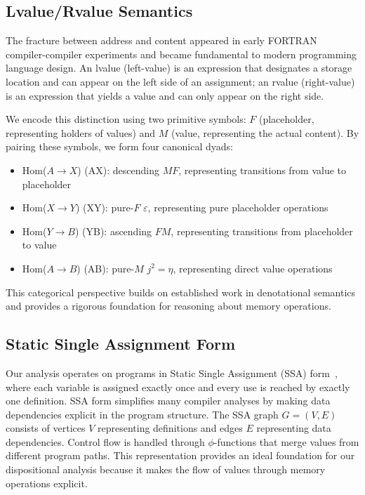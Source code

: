 \documentclass[acmsmall,anonymous,review,screen]{acmart}
\begin{document}
	\subsection{Lvalue/Rvalue Semantics}
	
	The fracture between address and content appeared in early FORTRAN compiler-compiler experiments and became fundamental to modern programming language design. An lvalue (left-value) is an expression that designates a storage location and can appear on the left side of an assignment; an rvalue (right-value) is an expression that yields a value and can only appear on the right side.
	
	We encode this distinction using two primitive symbols: $F$ (placeholder, representing holders of values) and $M$ (value, representing the actual content). By pairing these symbols, we form four canonical dyads:
	\begin{itemize}
		\item Hom($A \to X$) (AX): descending $MF$, representing transitions from value to placeholder
		\item Hom($X \to Y$) (XY): pure-$F$ $\varepsilon$, representing pure placeholder operations  
		\item Hom($Y \to B$) (YB): ascending $FM$, representing transitions from placeholder to value
		\item Hom($A \to B$) (AB): pure-$M$ $j^{2} = \eta$, representing direct value operations
	\end{itemize}
	
	This categorical perspective builds on established work in denotational semantics and provides a rigorous foundation for reasoning about memory operations.
	
	\subsection{Static Single Assignment Form}
	
	Our analysis operates on programs in Static Single Assignment (SSA) form~\cite{cytron1991efficiently}, where each variable is assigned exactly once and every use is reached by exactly one definition. SSA form simplifies many compiler analyses by making data dependencies explicit in the program structure. The SSA graph $G = (V, E)$ consists of vertices $V$ representing definitions and edges $E$ representing data dependencies. Control flow is handled through $\phi$-functions that merge values from different program paths. This representation provides an ideal foundation for our dispositional analysis because it makes the flow of values through memory operations explicit.
	
\end{document}
